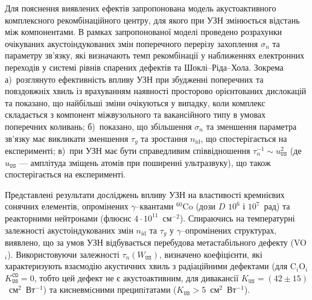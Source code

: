 Для пояснення виявлених ефектів запропонована модель акустоактивного комплексного рекомбінаційного центру,
для якого при УЗН змінюється відстань між компонентами.
В рамках запропонованої моделі проведено розрахунки очікуваних акустоіндукованих змін поперечного перерізу захоплення $\sigma_{n}$ та параметру зв'язку,
які визначають темп рекомбінації у наближеннях електронних переходів у системі рівнів спарених дефектів та  Шоклі--Ріда--Хола.
Зокрема
а)~розглянуто ефективність впливу УЗН при збудженні поперечних та повздовжніх хвиль із врахуванням наявності просторово орієнтованих дислокацій та показано, що найбільші зміни очікуються у випадку, коли комплекс складається з компонент міжвузольного та вакансійного типу  в умовах поперечних коливань;
б)~показано, що збільшення $\sigma_{n}$ та зменшення параметра зв'язку має викликати зменшення $\tau_g$ та зростання $n_\mathrm{id}$, що спостерігається на експерименті;
в)~при УЗН має бути справедливим співвідношення $\tau_{n}^{-1}\sim u_{\mathtt{US}}^2$ (де $u_\mathtt{US}$ --- амплітуда зміщень атомів при поширенні ультразвуку), що також спостерігається на експерименті.

Представлені результати досліджень впливу УЗН на властивості кремнієвих сонячних елементів,
опромінених $\gamma$--квантами $^{60}$Co (дози $D$ $10^6$ і $10^7$~рад) та реакторними нейтронами (флюєнс $4\cdot10^{11}$~см$^{-2}$).
Спираючись на температурні залежності акустоіндукованих змін $n_\mathrm{id}$ та $\tau_{g}$ у $\gamma$--опромінених структурах, виявлено, що за умов УЗН відбувається  перебудова метастабільного дефекту (VO$_i$).
Використовуючи залежності $\tau_n(W_\mathtt{US})$,  визначено коефіцієнти, які характеризують взаємодію акустичних хвиль з радіаційними дефектами (для C$_i$O$_i$ $K_\mathtt{US}^\mathtt{CO}=0$, тобто цей дефект не є акустоактивним,
для дивакансії $K_\mathtt{US}=(42\pm15)$~см$^2$~Вт$^{-1}$)
та кисневмiсними преципiтатами ($K_\mathtt{US}>5$~см$^2$~Вт$^{-1}$).

